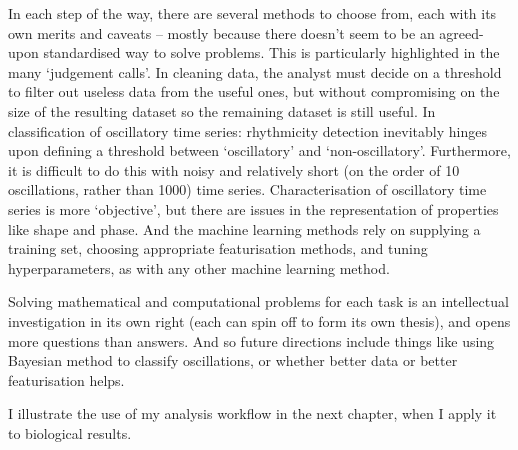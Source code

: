 In each step of the way, there are several methods to choose from, each with its own merits and caveats -- mostly because there doesn't seem to be an agreed-upon standardised way to solve problems.
This is particularly highlighted in the many `judgement calls'.
In cleaning data, the analyst must decide on a threshold to filter out useless data from the useful ones, but without compromising on the size of the resulting dataset so the remaining dataset is still useful.
In classification of oscillatory time series: rhythmicity detection inevitably hinges upon defining a threshold between `oscillatory' and `non-oscillatory'.
Furthermore, it is difficult to do this with noisy and relatively short (on the order of 10 oscillations, rather than 1000) time series.
Characterisation of oscillatory time series is more `objective', but there are issues in the representation of properties like shape and phase.
And the machine learning methods rely on supplying a training set, choosing appropriate featurisation methods, and tuning hyperparameters, as with any other machine learning method.

Solving mathematical and computational problems for each task is an intellectual investigation in its own right (each can spin off to form its own thesis), and opens more questions than answers.
And so future directions include things like using Bayesian method to classify oscillations, or whether better data or better featurisation helps.

I illustrate the use of my analysis workflow in the next chapter, when I apply it to biological results.
